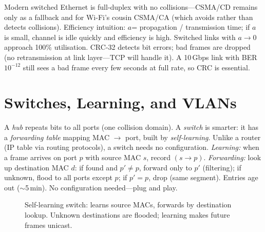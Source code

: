 Modern switched Ethernet is full-duplex with no collisions---CSMA/CD remains only as a fallback and for Wi-Fi's cousin CSMA/CA (which avoids rather than detects collisions). Efficiency intuition: $a$= propagation / transmission time; if $a$ is small, channel is idle quickly and efficiency is high. Switched links with $a\to0$ approach 100\% utilisation.
CRC-32 detects bit errors; bad frames are dropped (no retransmission at link layer---TCP will handle it). A 10\,Gbps link with BER $10^{-12}$ still sees a bad frame every few seconds at full rate, so CRC is essential.
\section{Switches, Learning, and VLANs}\label{sec:switches}
A \emph{hub} repeats bits to all ports (one collision domain). A \emph{switch} is smarter: it has a \emph{forwarding table} mapping MAC $\to$ port, built by \emph{self-learning}. Unlike a router (IP table via routing protocols), a switch needs no configuration.
\emph{Learning:} when a frame arrives on port $p$ with source MAC $s$, record $(s\to p)$. \emph{Forwarding:} look up destination MAC $d$: if found and $p'\neq p$, forward only to $p'$ (filtering); if unknown, flood to all ports except $p$; if $p'=p$, drop (same segment). Entries age out ($\sim$5\,min). No configuration needed---plug and play.
\begin{figure}[h]
\centering
{}%
\caption{Self-learning switch: learns source MACs, forwards by destination lookup. Unknown destinations are flooded; learning makes future frames unicast.}
\label{fig:switch-learning}
\end{figure}
